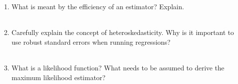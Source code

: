 \documentclass{article}
\begin{document}
\begin{enumerate}

    \item What is meant by the efficiency of an estimator? Explain. \\[1em]
\\[1em]

    \item Carefully explain the concept of heteroskedasticity. Why is it important to use robust standard errors when running regressions?\\[1em]
\\[1em]


    \item  What is a likelihood function? What needs to be assumed to derive the maximum likelihood estimator?\\[1em]
\end{enumerate}
\end{document}
